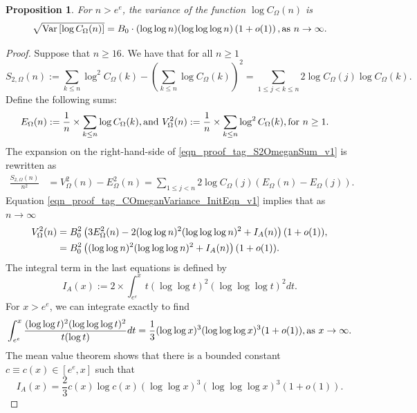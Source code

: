 \documentclass[11pt,reqno,a4letter]{article}
\numberwithin{equation}{section}
\numberwithin{figure}{section}
\numberwithin{table}{section}
\theoremstyle{plain}
\newtheorem{prop}[theorem]{Proposition}
\numberwithin{theorem}{section}
\theoremstyle{definition}
\theoremstyle{remark}
\newcommand{\mathtext}[1]{\text{\rm #1}}
\begin{document}
\begin{prop}
\label{prop_VarianceStat_for_COmegan_v1}
\label{prop_COmeganFunc_Variance_v1}
For $n > e^e$, the variance of the function $\log C_{\Omega}(n)$ is
\[
\sqrt{\operatorname{Var}\left[\log C_{\Omega}(n)\right]} = 
	B_0 \cdot (\log\log n) (\log\log\log n) \left(1 + o(1)\right), 
	\mathtext{ as } n \rightarrow \infty. 
\]
\end{prop}
\begin{proof}
Suppose that $n \geq 16$. We have that for all $n \geq 1$  
\begin{equation}
\label{eqn_proof_tag_S2OmeganSum_v1}
S_{2,\Omega}(n) := \sum_{k \leq n} \log^2 C_{\Omega}(k) - 
     \left(\sum_{k \leq n} \log C_{\Omega}(k)\right)^2 = 
     \sum_{1 \leq j < k \leq n} 2 \log C_{\Omega}(j) \log C_{\Omega}(k).
\end{equation}
Define the following sums:  
\begin{align*}
E_{\Omega}(n) & := \frac{1}{n} \times \sum_{k \leq n} \log C_{\Omega}(k), 
     \mathtext{ and } 
V_{\Omega}^2(n) := \frac{1}{n} \times \sum_{k \leq n} \log^2 C_{\Omega}(k), 
	\mathtext{ for } n \geq 1. 
\end{align*}
The expansion on the right-hand-side of \eqref{eqn_proof_tag_S2OmeganSum_v1} is rewritten as 
\begin{align}
\label{eqn_proof_tag_COmeganVariance_InitEqn_v1}
\frac{S_{2,\Omega}(n)}{n^2} & = V_{\Omega}^2(n) - E_{\Omega}^2(n) = 
     \sum_{1 \leq j < n} 2 \log C_{\Omega}(j) \left(
     E_{\Omega}(n) - E_{\Omega}(j)\right). 
\end{align} 
Equation \eqref{eqn_proof_tag_COmeganVariance_InitEqn_v1} implies that as $n \rightarrow \infty$ 
\begin{align}
\notag
V_{\Omega}^2(n) & = B_0^2 \left(3E_{\Omega}^2(n) - 
	2 (\log\log n)^2 (\log\log\log n)^2 + I_A(n)\right) (1+o(1)), \\ 
\label{eqn_proof_tag_COmeganVariance_InitEqn_v2}
	& =  B_0^2 \left((\log\log n)^2 (\log\log\log n)^2 + I_A(n)\right) (1+o(1)). 
\end{align} 
The integral term in the last equations is defined by 
\[
I_A(x) := 2 \times \int_{e^e}^x t (\log\log t)^2 (\log\log\log t)^2 dt. 
\]
For $x > e^e$, we can integrate exactly to find 
\[
\int_{e^e}^x \frac{(\log\log t)^2 (\log\log\log t)^2}{t(\log t)} dt = 
	\frac{1}{3} (\log\log x)^3 (\log\log\log x)^3 (1+o(1)), 
	\mathtext{ as } x \rightarrow \infty. 
\]
The mean value theorem shows that there is a bounded constant 
$c \equiv c(x) \in [e^e, x]$ such that 
\[
I_A(x) = \frac{2}{3} c(x) \log c(x) (\log\log x)^3 (\log\log\log x)^3 (1+o(1)). 
\]
\end{proof}
\end{document}
